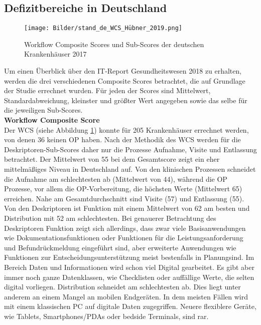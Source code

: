 \subsection{Defizitbereiche in Deutschland}
\label{sec:defizit_deutschland}
\begin{figure}[ht]
	\centering
 	\texttt{[image: Bilder/stand\_de\_WCS\_Hübner\_2019.png]}
	\caption{Workflow Composite Scores und Sub-Scores der deutschen Krankenhäuser 2017 \parencite[39]{huebner2019}}
	\label{fig:stand_de_WCS}
\end{figure}
Um einen Überblick über den IT-Report Gesundheitswesen 2018 zu erhalten, werden die drei verschiedenen Composite Scores betrachtet, die auf Grundlage der Studie errechnet wurden. Für jeden der Scores sind Mittelwert, Standardabweichung, kleinster und größter Wert angegeben sowie das selbe für die jeweiligen Sub-Scores.
\vspace{\parheadvspace}\\
\textbf{Workflow Composite Score}\\
Der WCS (siehe Abbildung \ref{fig:stand_de_WCS}) konnte für 205 Krankenhäuser errechnet werden, von denen 36 keinen OP haben. Nach der Methodik des WCS werden für die Deskriptoren-Sub-Scores daher nur die Prozesse Aufnahme, Visite und Entlassung betrachtet. Der Mittelwert von 55 bei dem Gesamtscore zeigt ein eher mittelmäßiges Niveau in Deutschland auf. Von den klinischen Prozessen schneidet die Aufnahme am schlechtesten ab (Mittelwert von 44), während die OP Prozesse, vor allem die OP-Vorbereitung, die höchsten Werte (Mittelwert 65) erreichen. Nahe am Gesamtdurchschnitt sind Visite (57) und Entlassung (55). Von den Deskriptoren ist Funktion mit einem Mittelwert von 62 am besten und Distribution mit 52 am schlechtesten. Bei genauerer Betrachtung des Deskriptoren Funktion zeigt sich allerdings, dass zwar viele Basisanwendungen wie Dokumentationsfunktionen oder Funktionen für die Leistungsanforderung und Befundrückmeldung eingeführt sind, aber erweiterte Anwendungen wie Funktionen zur Entscheidungsunterstützung meist bestenfalls \glqq in Planung\grqq{ }sind. Im Bereich Daten und Informationen wird schon viel Digital gearbeitet. Es gibt aber immer noch ganze Datenklassen, wie Checklisten oder auffällige Werte, die selten digital vorliegen. Distribution schneidet am schlechtesten ab. Dies liegt unter anderem an einem Mangel an mobilen Endgeräten. In dem meisten Fällen wird mit einem klassischen PC auf digitale Daten zugegriffen. Neuere flexiblere Geräte, wie Tablets, Smartphones/PDAs oder bedside Terminals, sind rar. \parencite{huebner2019}
